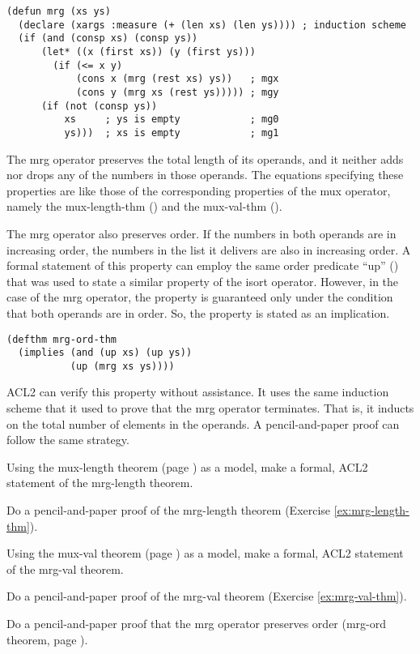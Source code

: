 \label{defun:mrg}
\begin{Verbatim}
(defun mrg (xs ys)
  (declare (xargs :measure (+ (len xs) (len ys)))) ; induction scheme
  (if (and (consp xs) (consp ys))
      (let* ((x (first xs)) (y (first ys)))
        (if (<= x y)
            (cons x (mrg (rest xs) ys))   ; mgx
            (cons y (mrg xs (rest ys))))) ; mgy
      (if (not (consp ys))
          xs     ; ys is empty            ; mg0
          ys)))  ; xs is empty            ; mg1
\end{Verbatim}

The mrg operator preserves the total length of its operands,
and it neither adds nor drops any of the numbers in those operands.
The equations specifying these properties are like those of the
corresponding properties of the mux operator, namely
the mux-length-thm (\pageref{mux-length-thm}) and the
mux-val-thm (\pageref{thm:mux-val}).

The mrg operator also preserves order.
If the numbers in both operands are in increasing order,
the numbers in the list it delivers are also in increasing order.
A formal statement of this property can employ the same order predicate
``up'' (\pageref{defun:up}) that was used to state a
similar property of the isort operator.
However, in the case of the mrg operator,
the property is guaranteed only under the condition
that both operands are in order.
So, the property is stated as an implication.

\label{defthm:mrg-ord}
\begin{Verbatim}
(defthm mrg-ord-thm
  (implies (and (up xs) (up ys))
           (up (mrg xs ys))))
\end{Verbatim}

ACL2 can verify this property without assistance.
It uses the same induction scheme that it used
to prove that the mrg operator terminates.
That is, it inducts on the total number of elements in the operands.
A pencil-and-paper proof can follow the same strategy.

\begin{ExerciseList}
\Exercise
\label{ex:mrg-length-thm}
Using the mux-length theorem (page \pageref{mux-length-thm})
as a model, make a formal, ACL2 statement of the mrg-length theorem.

\Exercise
Do a pencil-and-paper proof of the mrg-length theorem (Exercise \ref{ex:mrg-length-thm}).

\Exercise
\label{ex:mrg-val-thm}
Using the mux-val theorem (page \pageref{thm:mux-val})
as a model, make a formal, ACL2 statement of the mrg-val theorem.

\Exercise
Do a pencil-and-paper proof of the mrg-val theorem (Exercise \ref{ex:mrg-val-thm}).

\Exercise
Do a pencil-and-paper proof that the mrg operator preserves order
(mrg-ord theorem,  page \pageref{defthm:mrg-ord}).
\end{ExerciseList}


